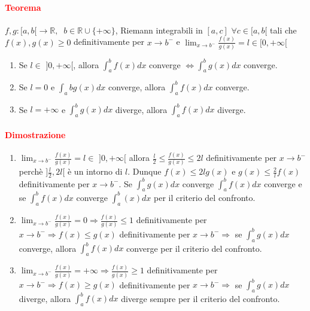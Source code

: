 \documentclass{article}
\newcommand{\R}{\mathbb{R}}
\begin{document}
\paragraph{\textcolor{red}{Teorema}}
$f,g: [a,b[\rightarrow \R, \,\,\ b\in \R \cup \{+\infty\}$, Riemann integrabili in $[a,c] \,\, \forall c \in [a,b[$ tali che $f(x),g(x)\geq 0$ definitivamente per $x \rightarrow b^-$ e $\lim_{x \rightarrow b^-} \frac{f(x)}{g(x)}=l \in [0,+\infty[$
\begin{enumerate}
    \item Se $l \in \,\, ]0,+\infty[$, allora $ \int_{a}^{b} f(x) dx$ converge $\Leftrightarrow \int_{a}^{b} g(x) dx$ converge.
    \item Se $l=0$ e $\int_{a}^{}b g(x)dx $ converge, allora $\int_{a}^{b} f(x) dx$ converge.
    \item Se $l=+\infty$ e $\int_{a}^{b} g(x) dx$ diverge, allora $\int_{a}^{b} f(x)dx$ diverge.
\end{enumerate}

\paragraph{\textcolor{red}{Dimostrazione}}
\begin{enumerate}
    \item $\lim_{x \rightarrow b^-}\frac{f(x)}{g(x)} = l \in \,\, ]0,+\infty[$ allora $\frac{l}{2}\leq \frac{f(x)}{g(x)}\leq 2l$ definitivamente per $x \rightarrow b^-$ perchè $]\frac{l}{2},2l[$ è un intorno di $l$. Dunque $f(x)\leq 2lg(x)$ e $g(x)\leq \frac{2}{l} f(x)$ definitivamente per $x \rightarrow b^-$. Se $\int_{a}^{b} g(x) dx$ converge $\int_{a}^{b} f(x) dx$ converge e se $\int_{a}^{b} f(x) dx$ converge $\int_{a}^{b} (x) dx$ per il criterio del confronto.
    \item $\lim_{x \rightarrow b^-} \frac{f(x)}{g(x)} = 0 \Rightarrow \frac{f(x)}{g(x)} \leq 1 $ definitivamente per $x\rightarrow b^- \Rightarrow f(x) \leq g(x)$ definitivamente per $x\rightarrow b^- \Rightarrow $ se $\int_{a}^{b} g(x)dx$ converge, allora $\int_{a}^{b} f(x)dx$ converge per il criterio del confronto.
    \item $\lim_{x \rightarrow b^-}\frac{f(x)}{g(x)} = +\infty \Rightarrow \frac{f(x)}{g(x)} \geq 1$ definitivamente per $x \rightarrow b^- \Rightarrow f(x) \geq g(x)$ definitivamente per $x \rightarrow b^- \Rightarrow$ se $\int_{a}^{b} g(x)dx$ diverge, allora $\int_{a}^{b} f(x)dx$ diverge sempre per il criterio del confronto.
\end{enumerate}
\begin{flushright}
\large\Lightning
\end{flushright}
\end{document}
